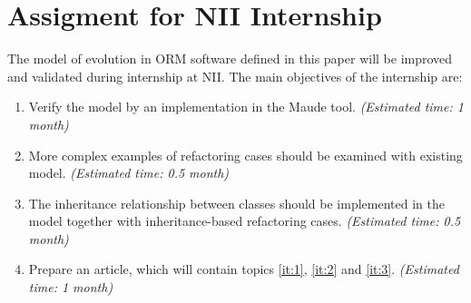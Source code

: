 \documentclass[11pt]{article}
\begin{document}
\section{Assigment for NII Internship}
The model of evolution in ORM software defined in this paper will be improved and validated during internship at NII. The main objectives of the internship are:
\begin{enumerate}
	\item \label{it:1} Verify the model by an implementation in the Maude tool. \emph{(Estimated time: 1 month)}
	\item \label{it:2} More complex examples of refactoring cases should be examined with existing model.  \emph{(Estimated time: 0.5 month)}
	\item \label{it:3} The inheritance relationship between classes should be implemented in the model together with inheritance-based refactoring cases. \emph{(Estimated time: 0.5 month)}
	\item Prepare an article, which will contain topics \ref{it:1}, \ref{it:2} and \ref{it:3}. \emph{(Estimated time: 1 month)}
\end{enumerate}
\end{document}
